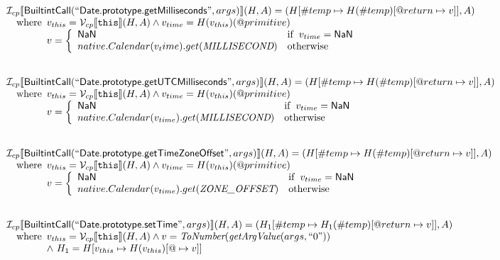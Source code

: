 \[\begin{array}{l}
\mathcal{I} _{cp}\llbracket \mbox{\textsf{BuiltintCall}}(``\mbox{\textsf{Date.prototype.getMilliseconds}}",args)\rrbracket(H,A)
  = (H[\#temp \mapsto H(\#temp)[@return \mapsto v]], A)\\
\quad{\rm where}\begin{array}[t]{l}
  v_{this} = \mathcal{V} _{cp}\llbracket \mbox{\texttt{this}}\rrbracket (H,A) \land v_{time} = H(v_{this})(@primitive)\\
  v = \left\{\begin{array}{ll}
    \mbox{\textsf{NaN}}  & {\rm if}\begin{array}[t]{l}v_{time} = \mbox{\textsf{NaN}}\end{array}\\
    native.Calendar(v_time).get(\emph{MILLISECOND}) & {\rm otherwise}
    \end{array}\right.
  \end{array}\\
\\\\

\mathcal{I} _{cp}\llbracket \mbox{\textsf{BuiltintCall}}(``\mbox{\textsf{Date.prototype.getUTCMilliseconds}}",args)\rrbracket(H,A)
  = (H[\#temp \mapsto H(\#temp)[@return \mapsto v]], A)\\
\quad{\rm where}\begin{array}[t]{l}
  v_{this} = \mathcal{V} _{cp}\llbracket \mbox{\texttt{this}}\rrbracket (H,A) \land v_{time} = H(v_{this})(@primitive)\\
  v = \left\{\begin{array}{ll}
    \mbox{\textsf{NaN}}  & {\rm if}\begin{array}[t]{l}v_{time} = \mbox{\textsf{NaN}}\end{array}\\
    native.Calendar(v_{time}).get(\emph{MILLISECOND}) & {\rm otherwise}
    \end{array}\right.
  \end{array}\\
\\\\

\mathcal{I} _{cp}\llbracket \mbox{\textsf{BuiltintCall}}(``\mbox{\textsf{Date.prototype.getTimeZoneOffset}}",args)\rrbracket(H,A)
  = (H[\#temp \mapsto H(\#temp)[@return \mapsto v]], A)\\
\quad{\rm where}\begin{array}[t]{l}
  v_{this} = \mathcal{V} _{cp}\llbracket \mbox{\texttt{this}}\rrbracket (H,A) \land v_{time} = H(v_{this})(@primitive)\\
  v = \left\{\begin{array}{ll}
    \mbox{\textsf{NaN}}  & {\rm if}\begin{array}[t]{l}v_{time} = \mbox{\textsf{NaN}}\end{array}\\
    native.Calendar(v_{time}).get(\emph{ZONE\_OFFSET}) & {\rm otherwise}
    \end{array}\right.
  \end{array}\\
\\\\

\mathcal{I} _{cp}\llbracket \mbox{\textsf{BuiltintCall}}(``\mbox{\textsf{Date.prototype.setTime}}",args)\rrbracket(H,A)
  = (H_1[\#temp \mapsto H_1(\#temp)[@return \mapsto v]], A)\\
\quad{\rm where}\begin{array}[t]{l}
  v_{this} = \mathcal{V} _{cp}\llbracket \mbox{\texttt{this}}\rrbracket (H,A)
  \land v = \emph{ToNumber}(\emph{getArgValue}(args, ``0"))\\
  \land\ H_1 = H[v_{this} \mapsto H(v_{this})[@\mapsto v]]
  \end{array}\\
\\\\


\end{array}
\]


